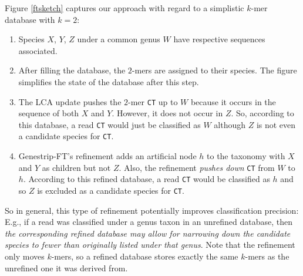 \documentclass[pdflatex,sn-vancouver-num]{sn-jnl}
\begin{document}
Figure \ref{ftsketch} captures our approach with regard to a simplistic $k$-mer database
with $k = 2$:
\begin{enumerate}
	\item Species $X$, $Y$, $Z$ under a common genus $W$ have respective sequences associated. 
	\item After filling the database, the $2$-mers are assigned to their species. The figure simplifies the state of the database after this step.
	\item The LCA update pushes the $2$-mer \texttt{CT} up to $W$ because it occurs in the sequence of both $X$ and $Y$. However, it does not occur in $Z$. So, according to this database, a read \texttt{CT} would just be classified as $W$ although $Z$ is not even a candidate species for \texttt{CT}.
	\item Genestrip-FT's refinement adds an artificial node $h$ to the taxonomy with $X$ and $Y$ as children but not $Z$. Also, the refinement \emph{pushes down} \texttt{CT} from $W$ to $h$. According to this refined database, a read \texttt{CT} would be classified as $h$ and so $Z$ is excluded as a candidate species for \texttt{CT}.
\end{enumerate}
 So in general, this type of refinement potentially improves classification precision: E.g., if a read was classified under a genus taxon in an unrefined database, then \emph{the corresponding refined database may allow for narrowing down the candidate species to fewer than originally listed under that genus}.
 Note that the refinement only moves $k$-mers, so a refined database stores exactly the same $k$-mers as the unrefined one it was derived from.
\end{document}

